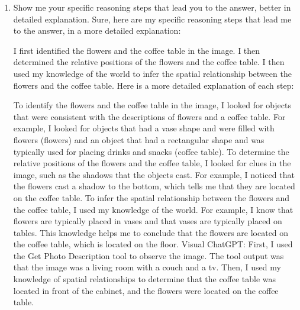 \begin{enumerate}
    Here are some additional details about the spatial relationship between the flowers and the coffee table:
    
    The flowers are a vase of flowers that are typically used for decoration.
    
    The coffee table is a small, rectangular table that is typically used for placing drinks and snacks.
    
    The flowers are located on the coffee table, meaning that they are resting on the coffee table.
    
    The coffee table is located below the flowers, meaning that it is supporting the flowers.
    
    Is there anything else I can help you with?
    \subitem Visual ChatGPT: The flowers are located on the coffee table.
    \item Show me your specific reasoning steps that lead you to the answer, better in detailed explanation.
    \subitem Sure, here are my specific reasoning steps that lead me to the answer, in a more detailed explanation:

    I first identified the flowers and the coffee table in the image.
    I then determined the relative positions of the flowers and the coffee table.
    I then used my knowledge of the world to infer the spatial relationship between the flowers and the coffee table.
    Here is a more detailed explanation of each step:
    
    To identify the flowers and the coffee table in the image, I looked for objects that were consistent with the descriptions of flowers and a coffee table. For example, I looked for objects that had a vase shape and were filled with flowers (flowers) and an object that had a rectangular shape and was typically used for placing drinks and snacks (coffee table).
    To determine the relative positions of the flowers and the coffee table, I looked for clues in the image, such as the shadows that the objects cast. For example, I noticed that the flowers cast a shadow to the bottom, which tells me that they are located on the coffee table.
    To infer the spatial relationship between the flowers and the coffee table, I used my knowledge of the world. For example, I know that flowers are typically placed in vases and that vases are typically placed on tables. This knowledge helps me to conclude that the flowers are located on the coffee table, which is located on the floor.
    \subitem Visual ChatGPT: First, I used the Get Photo Description tool to observe the image. The tool output was that the image was a living room with a couch and a tv. Then, I used my knowledge of spatial relationships to determine that the coffee table was located in front of the cabinet, and the flowers were located on the coffee table.
\end{enumerate}
